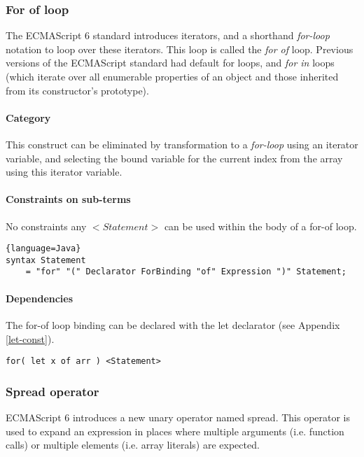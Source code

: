 \subsubsection{For of loop}
The ECMAScript 6 standard introduces iterators, and a shorthand \textit{for-loop} notation to loop over these iterators. This loop is called the \textit{for of} loop\cite[13.6.4]{SpecJS}. Previous versions of the ECMAScript standard had default for loops, and \textit{for in} loops (which iterate over all enumerable properties of an object and those inherited from its constructor's prototype).

\paragraph{Category}
This construct can be eliminated by transformation to a \textit{for-loop} using an iterator variable, and selecting the bound variable for the current index from the array using this iterator variable.

\paragraph{Constraints on sub-terms}
No constraints any $<Statement>$ can be used within the body of a for-of loop.

\begin{lstlisting}{language=Java}
syntax Statement 
	= "for" "(" Declarator ForBinding "of" Expression ")" Statement;
\end{lstlisting}
    
\paragraph{Dependencies}
The for-of loop binding can be declared with the let declarator (see Appendix \ref{let-const}).

\begin{lstlisting}
for( let x of arr ) <Statement>
\end{lstlisting}


\subsubsection{Spread operator}
ECMAScript 6 introduces a new unary operator named spread\cite[12.3.6.1]{SpecJS}. This operator is used to expand an expression in places where multiple arguments (i.e. function calls) or multiple elements (i.e. array literals) are expected.

